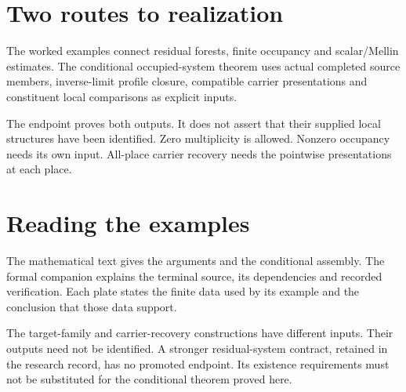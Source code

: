 \documentclass[12pt,a4paper]{article}
\begin{document}
\KomorebiCover
{}

\section*{Two routes to realization}
The worked examples connect residual forests, finite occupancy and scalar/Mellin estimates. The conditional occupied-system theorem uses actual completed source members, inverse-limit profile closure, compatible carrier presentations and constituent local comparisons as explicit inputs.
\begin{center}
\end{center}
The endpoint proves both outputs. It does not assert that their supplied local structures have been identified. Zero multiplicity is allowed. Nonzero occupancy needs its own input. All-place carrier recovery needs the pointwise presentations at each place.
\clearpage
\section*{Reading the examples}
The mathematical text gives the arguments and the conditional assembly. The
formal companion explains the terminal source, its dependencies and recorded
verification. Each plate states the finite data used by its example and the
conclusion that those data support.

The target-family and carrier-recovery constructions have different inputs.
Their outputs need not be identified. A stronger residual-system contract,
retained in the research record, has no promoted endpoint. Its existence
requirements must not be substituted for the conditional theorem proved here.
\clearpage
\setcounter{page}{1}\renewcommand{\thepage}{\arabic{page}}

\end{document}
